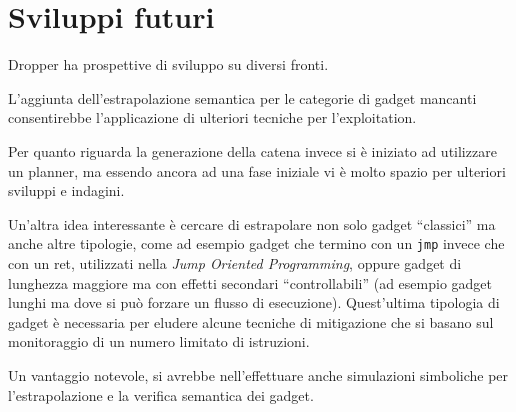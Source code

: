 \section{Sviluppi futuri}


Dropper ha prospettive di sviluppo su diversi fronti. 

L'aggiunta dell'estrapolazione semantica per le categorie di gadget
mancanti consentirebbe l'applicazione di ulteriori tecniche per
l'exploitation.

Per quanto riguarda la generazione della catena invece si è iniziato
ad utilizzare un planner, ma essendo ancora ad una fase iniziale vi è
molto spazio per ulteriori sviluppi e indagini.

Un'altra idea interessante è cercare di estrapolare non solo gadget
``classici'' ma anche altre tipologie, come ad esempio gadget che
termino con un \lstinline{jmp} invece che con un ret, utilizzati nella
\emph{Jump Oriented Programming}, oppure gadget di lunghezza maggiore
ma con effetti secondari ``controllabili'' (ad esempio gadget lunghi
ma dove si può forzare un flusso di esecuzione). Quest'ultima
tipologia di gadget è necessaria per eludere alcune tecniche di
mitigazione che si basano sul monitoraggio di un numero limitato di
istruzioni.

Un vantaggio notevole, si avrebbe nell'effettuare anche simulazioni
simboliche per l'estrapolazione e la verifica semantica dei gadget.


